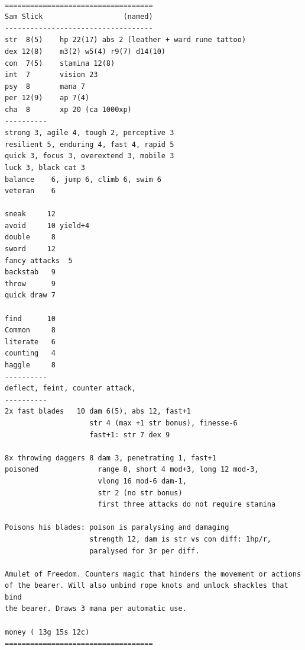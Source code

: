 \

\goodbreak \begin{samepage} \vsmall \begin{verbatim}
===================================
Sam Slick                   (named)
-----------------------------------
str  8(5)    hp 22(17) abs 2 (leather + ward rune tattoo)
dex 12(8)    m3(2) w5(4) r9(7) d14(10)
con  7(5)    stamina 12(8)
int  7       vision 23
psy  8       mana 7
per 12(9)    ap 7(4)
cha  8       xp 20 (ca 1000xp)
----------
strong 3, agile 4, tough 2, perceptive 3
resilient 5, enduring 4, fast 4, rapid 5
quick 3, focus 3, overextend 3, mobile 3
luck 3, black cat 3
balance    6, jump 6, climb 6, swim 6
veteran    6

sneak     12
avoid     10 yield+4
double     8
sword     12
fancy attacks  5
backstab   9
throw      9
quick draw 7

find      10
Common     8
literate   6
counting   4
haggle     8
----------
deflect, feint, counter attack,
----------
2x fast blades   10 dam 6(5), abs 12, fast+1
                    str 4 (max +1 str bonus), finesse-6
                    fast+1: str 7 dex 9

8x throwing daggers 8 dam 3, penetrating 1, fast+1
poisoned              range 8, short 4 mod+3, long 12 mod-3,
                      vlong 16 mod-6 dam-1,
                      str 2 (no str bonus)
                      first three attacks do not require stamina

Poisons his blades: poison is paralysing and damaging
                    strength 12, dam is str vs con diff: 1hp/r,
                    paralysed for 3r per diff.

Amulet of Freedom. Counters magic that hinders the movement or actions
of the bearer. Will also unbind rope knots and unlock shackles that bind
the bearer. Draws 3 mana per automatic use.

money ( 13g 15s 12c)
===================================
\end{verbatim} \normalsize \end{samepage}

\

\flushbottom















